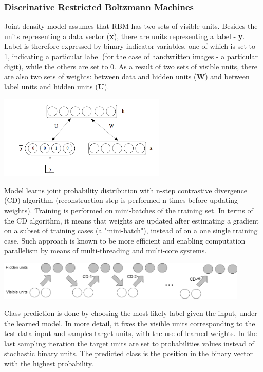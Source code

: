 \documentclass[a4paper]{scrartcl}
\begin{document}
\subsubsection{Discrinative Restricted Boltzmann Machines}
Joint density model assumes that RBM has two sets of visible units. Besides the units representing a data vector ({\bfseries x}), there are units representing a label - {\bfseries y}. Label is therefore expressed by binary indicator variables, one of which is set to 1, indicating a particular label (for the case of handwritten images - a particular digit), while the others are set to 0. 
As a result of two sets of visible units, there are also two sets of weights: between data and hidden units ({\bfseries W}) and between label units and hidden units ({\bfseries U}). 
\begin{center}
\includegraphics[width=8cm]{images/jointProbModel2.png}
\end{center}
Model learns joint probability distribution with n-step contrastive divergence (CD) algorithm (reconstruction step is performed n-times before updating weights). Training is performed on mini-batches of the training set. In terms of the CD algorithm, it means that weights are updated after estimating a gradient on a subset of training cases (a "mini-batch"), instead of on a one single training case. Such approach is known to be more efficient and enabling computation parallelism by means of multi-threading and multi-core systems.
\begin{center}
\includegraphics[width=12cm]{images/cd-n.png}
\end{center} 
\par Class prediction is done by choosing the most likely label given the input, under the learned model. In more detail, it fixes the visible units corresponding to the test data input and samples target units, with the use of learned weights. In the last sampling iteration the target units are set to probabilities values instead of stochastic binary units. The predicted class is the position in the binary vector with the highest probability. 
\end{document}
